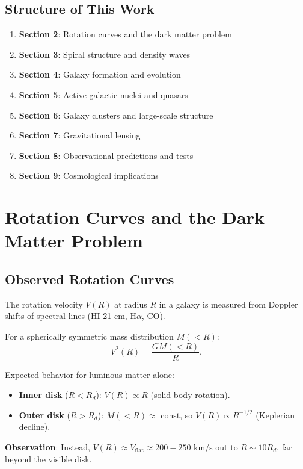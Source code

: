 \documentclass[12pt,a4paper]{article}
\theoremstyle{definition}
\theoremstyle{remark}
\begin{document}
\subsection{Structure of This Work}

\begin{enumerate}
\item \textbf{Section 2}: Rotation curves and the dark matter problem
\item \textbf{Section 3}: Spiral structure and density waves
\item \textbf{Section 4}: Galaxy formation and evolution
\item \textbf{Section 5}: Active galactic nuclei and quasars
\item \textbf{Section 6}: Galaxy clusters and large-scale structure
\item \textbf{Section 7}: Gravitational lensing
\item \textbf{Section 8}: Observational predictions and tests
\item \textbf{Section 9}: Cosmological implications
\end{enumerate}

\section{Rotation Curves and the Dark Matter Problem}

\subsection{Observed Rotation Curves}

The rotation velocity $V(R)$ at radius $R$ in a galaxy is measured from Doppler shifts of spectral lines (HI 21 cm, H$\alpha$, CO).

For a spherically symmetric mass distribution $M(<R)$:
\begin{equation}
V^2(R) = \frac{GM(<R)}{R}.
\end{equation}

Expected behavior for luminous matter alone:
\begin{itemize}
\item \textbf{Inner disk} ($R < R_d$): $V(R) \propto R$ (solid body rotation).
\item \textbf{Outer disk} ($R > R_d$): $M(<R) \approx$ const, so $V(R) \propto R^{-1/2}$ (Keplerian decline).
\end{itemize}

\textbf{Observation}: Instead, $V(R) \approx V_{\text{flat}} \approx 200-250$ km/s out to $R \sim 10 R_d$, far beyond the visible disk.
\end{document}
